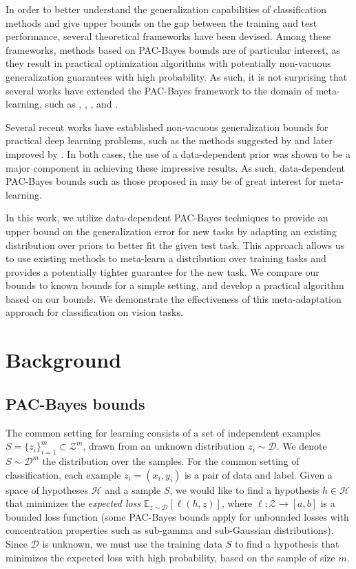 \documentclass{article} %
\theoremstyle{definition}
\newcommand{\Expect}[2]{\mathbb{E}_{#1}\left [#2 \right ]}
\begin{document}
In order to better understand the generalization capabilities of classification methods and give upper bounds on the gap between the training and test performance, several theoretical frameworks have been devised.  Among these frameworks, methods based on PAC-Bayes bounds \citep{Mcallester} are of particular interest, as they result in practical optimization algorithms with potentially non-vacuous generalization guarantees with high probability. As such, it is not surprising that several works have extended the PAC-Bayes framework to the domain of meta-learning, such as \citet{Pentina2014}, \citet{Amit2018}, \citet{Rothfuss2020}, \citet{Liu2021} and \citet{Farid2021}.

Several recent works have established non-vacuous generalization bounds for practical deep learning problems, such as the methods suggested by \citet{Dziugaite2017} and later improved by \citet{Perez-Ortiz2021}. In both cases, the use of a data-dependent prior was shown to be a major component in achieving these impressive results. As such, data-dependent PAC-Bayes bounds such as those proposed in \citet{Rivasplata2020} may be of great interest for meta-learning.

In this work, we utilize data-dependent PAC-Bayes techniques to provide an upper bound on the generalization error for new tasks by adapting an existing distribution over priors to better fit the given test task. This approach allows us to use existing methods to meta-learn a distribution over training tasks and provides a potentially tighter guarantee for the new task.
We compare our bounds to known bounds for a simple setting, and develop a practical algorithm based on our bounds. We demonstrate the effectiveness of this meta-adaptation approach for classification on vision tasks.

\section{Background}

\subsection{PAC-Bayes bounds}

The common setting for learning consists of a set of independent examples $S=\{z_i\}_{i=1}^{m}\subset \mathcal{Z}^m$, drawn from an unknown distribution $z_i\sim \mathcal{D}$. We denote $S\sim \mathcal{D}^m$ the distribution over the samples. 
For the common setting of classification, each example $z_i=(x_i,y_i)$ is a pair of data and label.
Given a space of hypotheses $\mathcal{H}$ and a sample $S$, we would like to find a hypothesis $h\in \mathcal{H}$ that minimizes the \emph{expected loss} $\Expect{z\sim \mathcal{D}}{\ell(h,z)}$, where $\ell:\mathcal{Z}\rightarrow [a,b]$ is a bounded loss function (some PAC-Bayes bounds apply for unbounded losses with concentration properties such as sub-gamma and sub-Gaussian distributions).
Since $\mathcal{D}$ is unknown, we must use the training data $S$ to find a hypothesis that minimizes the expected loss with high probability, based on the sample of size $m$.
\end{document}
